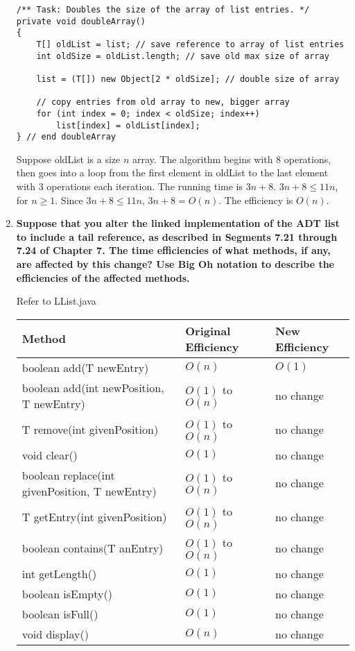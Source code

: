 \documentclass[10pt]{article}
\begin{document}
\begin{enumerate}
			\vspace{0.5cm}
			\begin{lstlisting}
/** Task: Doubles the size of the array of list entries. */
private void doubleArray()
{
    T[] oldList = list; // save reference to array of list entries
    int oldSize = oldList.length; // save old max size of array
    
    list = (T[]) new Object[2 * oldSize]; // double size of array
    
    // copy entries from old array to new, bigger array
    for (int index = 0; index < oldSize; index++)
        list[index] = oldList[index];
} // end doubleArray
			\end{lstlisting}
			
			Suppose oldList is a size $n$ array. The algorithm begins with 8 operations, then goes into a loop from the first element in oldList to the last element with 3 operations each iteration. The running time is $3n + 8$. $3n + 8 \leq 11n$, for $n \geq 1$. Since $3n + 8 \leq 11n$, $3n + 8 = O(n)$. The efficiency is $O(n)$.
			\vspace{0.5cm}
		
		\setcounter{enumi}{4}
		\item \textbf{Suppose that you alter the linked implementation of the ADT list to include a tail reference, as described in Segments 7.21 through 7.24 of Chapter 7. The time efficiencies of what methods, if any, are affected by this change? Use Big Oh notation to describe the efficiencies of the affected methods.}
			
			\vspace{0.5cm}
			Refer to LList.java
			
			\vspace{0.5cm}
			\begin{tabular}{|l|l|l|}
				\hline
				\textbf{Method} & \textbf{Original Efficiency} & \textbf{New Efficiency} \\
				\hline
				boolean add(T newEntry) & $O(n)$ & $O(1)$ \\
				\hline
				boolean add(int newPosition, T newEntry) & $O(1)$ to $O(n)$ & no change \\
				\hline
				T remove(int givenPosition) & $O(1)$ to $O(n)$ & no change \\
				\hline
				void clear() & $O(1)$ & no change\\
				\hline
				boolean replace(int givenPosition, T newEntry) & $O(1)$ to $O(n)$ & no change \\
				\hline
				T getEntry(int givenPosition) & $O(1)$ to $O(n)$ & no change \\
				\hline
				boolean contains(T anEntry) & $O(1)$ to $O(n)$ & no change \\
				\hline
				int getLength() & $O(1)$ & no change \\
				\hline
				boolean isEmpty() & $O(1)$ & no change \\
				\hline
				boolean isFull() & $O(1)$ & no change \\
				\hline
				void display() & $O(n)$ & no change \\
				\hline
			\end{tabular}
			

\end{enumerate}
\end{document}
